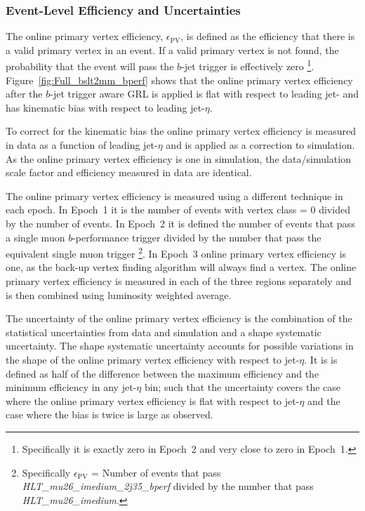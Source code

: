 \newpage

\subsubsection{Event-Level Efficiency and Uncertainties}
\label{sec:trig-eventLevelEff}

The online primary vertex efficiency, $\epsilon_{\text{PV}}$,
is defined as the efficiency that there is a valid primary vertex in an event.
If a valid primary vertex is not found, the probability that the event will pass the $b$-jet trigger is effectively zero
\footnote{Specifically it is exactly zero in Epoch~2 and very close to zero in Epoch~1.}.
Figure~\ref{fig:Full_bslt2mm_bperf} shows that the online primary vertex efficiency
after the $b$-jet trigger aware GRL is applied is flat with respect to leading jet-\pT{}
and has kinematic bias with respect to leading jet-$\eta$.

To correct for the kinematic bias the online primary vertex efficiency is measured in data as a function of leading jet-$\eta$ and is applied as a correction to simulation.
As the online primary vertex efficiency is one in simulation, the data/simulation scale factor and efficiency measured in data are identical.

The online primary vertex efficiency is measured using a different technique in each epoch.
In Epoch~1 it is the number of events with vertex class = 0 divided by the number of events.
In Epoch~2 it is defined the number of events that pass a single muon $b$-performance trigger divided
by the number that pass the equivalent single muon trigger \footnote{ Specifically $\epsilon_{\text{PV}}$ = Number of events that pass \textit{HLT\_mu26\_imedium\_2j35\_bperf}
  divided by the number that pass \textit{HLT\_mu26\_imedium}.}.
In Epoch~3 online primary vertex efficiency is one, as the back-up vertex finding algorithm will always find a vertex.
The online primary vertex efficiency is measured in each of the three regions separately and is then combined using luminosity weighted average.

The uncertainty of the online primary vertex efficiency is the combination of the statistical uncertainties from data and simulation
and a shape systematic uncertainty.
The shape systematic uncertainty accounts for possible variations in the shape of the online primary vertex efficiency with respect to jet-$\eta$.
It is is defined as half of the difference between the maximum efficiency and the minimum efficiency in any jet-$\eta$ bin;
such that the uncertainty covers the case where the online primary vertex efficiency is flat with respect to jet-$\eta$ and
the case where the bias is twice is large as observed.

